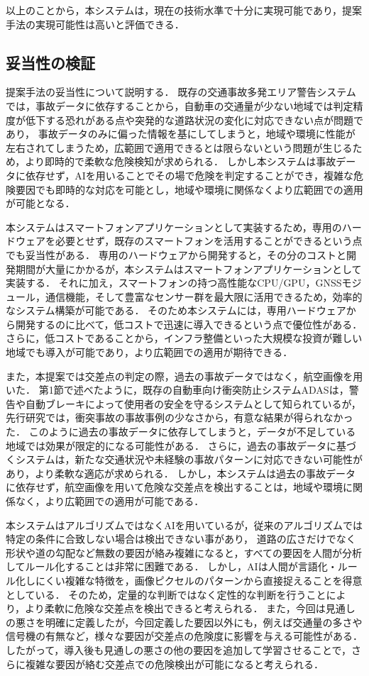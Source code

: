 \documentclass[uplatex,dvipdfmx]{jsarticle}
\begin{document}
以上のことから，本システムは，現在の技術水準で十分に実現可能であり，提案手法の実現可能性は高いと評価できる．

\subsection{妥当性の検証}
提案手法の妥当性について説明する．
既存の交通事故多発エリア警告システムでは，事故データに依存することから，自動車の交通量が少ない地域では判定精度が低下する恐れがある点や突発的な道路状況の変化に対応できない点が問題であり，
事故データのみに偏った情報を基にしてしまうと，地域や環境に性能が左右されてしまうため，広範囲で適用できるとは限らないという問題が生じるため，より即時的で柔軟な危険検知が求められる．
しかし本システムは事故データに依存せず，AIを用いることでその場で危険を判定することができ，複雑な危険要因でも即時的な対応を可能とし，地域や環境に関係なくより広範囲での適用が可能となる．

本システムはスマートフォンアプリケーションとして実装するため，専用のハードウェアを必要とせず，既存のスマートフォンを活用することができるという点でも妥当性がある．
専用のハードウェアから開発すると，その分のコストと開発期間が大量にかかるが，本システムはスマートフォンアプリケーションとして実装する．
それに加え，スマートフォンの持つ高性能なCPU/GPU，GNSSモジュール，通信機能，そして豊富なセンサー群を最大限に活用できるため，効率的なシステム構築が可能である．
そのため本システムには，専用ハードウェアから開発するのに比べて，低コストで迅速に導入できるという点で優位性がある．
さらに，低コストであることから，インフラ整備といった大規模な投資が難しい地域でも導入が可能であり，より広範囲での適用が期待できる．

また，本提案では交差点の判定の際，過去の事故データではなく，航空画像を用いた．
第1節で述べたように，既存の自動車向け衝突防止システムADASは，警告や自動ブレーキによって使用者の安全を守るシステムとして知られているが，
先行研究では，衝突事故の事故事例の少なさから，有意な結果が得られなかった．
このように過去の事故データに依存してしまうと，データが不足している地域では効果が限定的になる可能性がある．
さらに，過去の事故データに基づくシステムは，新たな交通状況や未経験の事故パターンに対応できない可能性があり，より柔軟な適応が求められる．
しかし，本システムは過去の事故データに依存せず，航空画像を用いて危険な交差点を検出することは，地域や環境に関係なく，より広範囲での適用が可能である．

本システムはアルゴリズムではなくAIを用いているが，従来のアルゴリズムでは特定の条件に合致しない場合は検出できない事があり，
道路の広さだけでなく形状や道の勾配など無数の要因が絡み複雑になると，すべての要因を人間が分析してルール化することは非常に困難である．
しかし，AIは人間が言語化・ルール化しにくい複雑な特徴を，画像ピクセルのパターンから直接捉えることを得意としている．
そのため，定量的な判断ではなく定性的な判断を行うことにより，より柔軟に危険な交差点を検出できると考えられる．
また，今回は見通しの悪さを明確に定義したが，今回定義した要因以外にも，例えば交通量の多さや信号機の有無など，様々な要因が交差点の危険度に影響を与える可能性がある．
したがって，導入後も見通しの悪さの他の要因を追加して学習させることで，さらに複雑な要因が絡む交差点での危険検出が可能になると考えられる．
\end{document}
